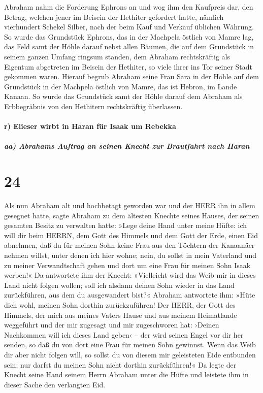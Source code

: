 Abraham nahm die Forderung Ephrons an und wog ihm den Kaufpreis dar, den
Betrag, welchen jener im Beisein der Hethiter gefordert hatte, nämlich
vierhundert Schekel Silber, nach der beim Kauf und Verkauf üblichen
Währung.  So wurde das Grundstück Ephrons, das in der
Machpela östlich von Mamre lag, das Feld samt der Höhle darauf nebst
allen Bäumen, die auf dem Grundstück in seinem ganzen Umfang ringsum
standen,  dem Abraham rechtskräftig als Eigentum
abgetreten im Beisein der Hethiter, so viele ihrer ins Tor seiner Stadt
gekommen waren.  Hierauf begrub Abraham seine Frau Sara
in der Höhle auf dem Grundstück in der Machpela östlich von Mamre, das
ist Hebron, im Lande Kanaan.  So wurde das Grundstück
samt der Höhle darauf dem Abraham als Erbbegräbnis von den Hethitern
rechtskräftig überlassen.

\hypertarget{r-elieser-wirbt-in-haran-fuxfcr-isaak-um-rebekka}{%
\paragraph{r) Elieser wirbt in Haran für Isaak um
Rebekka}\label{r-elieser-wirbt-in-haran-fuxfcr-isaak-um-rebekka}}

\hypertarget{aa-abrahams-auftrag-an-seinen-knecht-zur-brautfahrt-nach-haran}{%
\subparagraph{aa) Abrahams Auftrag an seinen Knecht zur Brautfahrt nach
Haran}\label{aa-abrahams-auftrag-an-seinen-knecht-zur-brautfahrt-nach-haran}}

\hypertarget{section-23}{%
\section{24}\label{section-23}}

 Als nun Abraham alt und hochbetagt geworden war und der
HERR ihn in allem gesegnet hatte,  sagte Abraham zu dem
ältesten Knechte seines Hauses, der seinen gesamten Besitz zu verwalten
hatte: »Lege deine Hand unter meine Hüfte:  ich will dir
beim HERRN, dem Gott des Himmels und dem Gott der Erde, einen Eid
abnehmen, daß du für meinen Sohn keine Frau aus den Töchtern der
Kanaanäer nehmen willst, unter denen ich hier wohne; 
nein, du sollst in mein Vaterland und zu meiner Verwandtschaft gehen und
dort um eine Frau für meinen Sohn Isaak werben!«  Da
antwortete ihm der Knecht: »Vielleicht wird das Weib mir in dieses Land
nicht folgen wollen; soll ich alsdann deinen Sohn wieder in das Land
zurückführen, aus dem du ausgewandert bist?«  Abraham
antwortete ihm: »Hüte dich wohl, meinen Sohn dorthin zurückzuführen!
 Der HERR, der Gott des Himmels, der mich aus meines
Vaters Hause und aus meinem Heimatlande weggeführt und der mir zugesagt
und mir zugeschworen hat: ›Deinen Nachkommen will ich dieses Land geben‹
-- der wird seinen Engel vor dir her senden, so daß du von dort eine
Frau für meinen Sohn gewinnst.  Wenn das Weib dir aber
nicht folgen will, so sollst du von diesem mir geleisteten Eide
entbunden sein; nur darfst du meinen Sohn nicht dorthin zurückführen!«
 Da legte der Knecht seine Hand seinem Herrn Abraham unter
die Hüfte und leistete ihm in dieser Sache den verlangten Eid.

